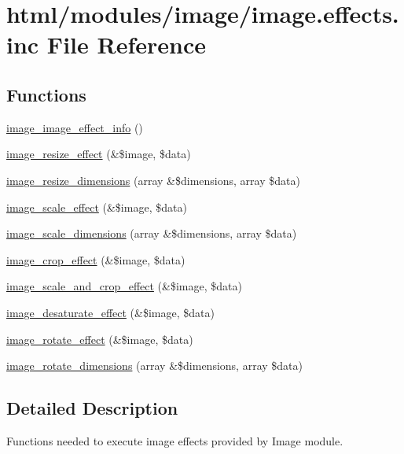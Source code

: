 \hypertarget{image_8effects_8inc}{
\section{html/modules/image/image.effects.inc File Reference}
\label{image_8effects_8inc}
}
\subsection*{Functions}
\begin{DoxyCompactItemize}
\item 
\hyperlink{image_8effects_8inc_afb803d9c3a66defed06662a85be09dd7}{image\_\-image\_\-effect\_\-info} ()
\item 
\hyperlink{image_8effects_8inc_a51bdcc43e0a3213fa4255254583e0cc8}{image\_\-resize\_\-effect} (\&\$image, \$data)
\item 
\hyperlink{image_8effects_8inc_a1bfdf4f818750949e3c1665b8dab8635}{image\_\-resize\_\-dimensions} (array \&\$dimensions, array \$data)
\item 
\hyperlink{image_8effects_8inc_a8884cec5b6adcc1c0728ff82043cc87a}{image\_\-scale\_\-effect} (\&\$image, \$data)
\item 
\hyperlink{image_8effects_8inc_ae48bbf6c76176bbda1608536ac46f125}{image\_\-scale\_\-dimensions} (array \&\$dimensions, array \$data)
\item 
\hyperlink{image_8effects_8inc_a90a017a1639d3d79a9e76b492079279f}{image\_\-crop\_\-effect} (\&\$image, \$data)
\item 
\hyperlink{image_8effects_8inc_a5280c11ad64a5dc2a5e3bb30e68f1bff}{image\_\-scale\_\-and\_\-crop\_\-effect} (\&\$image, \$data)
\item 
\hyperlink{image_8effects_8inc_a7952d1a3347f2974385677b80325256e}{image\_\-desaturate\_\-effect} (\&\$image, \$data)
\item 
\hyperlink{image_8effects_8inc_ad9acbcdd3e9f925b5e6f005c5f292283}{image\_\-rotate\_\-effect} (\&\$image, \$data)
\item 
\hyperlink{image_8effects_8inc_ac0eea036cc6c90cf7e96934462dad22f}{image\_\-rotate\_\-dimensions} (array \&\$dimensions, array \$data)
\end{DoxyCompactItemize}


\subsection{Detailed Description}
Functions needed to execute image effects provided by Image module. 

